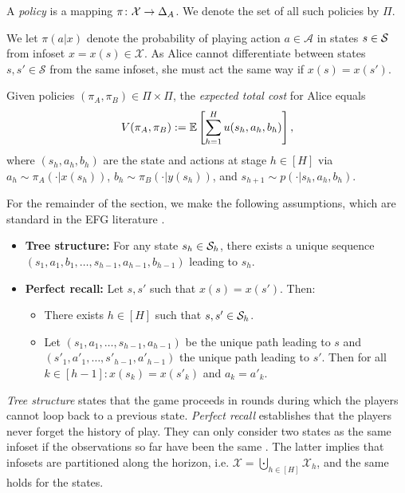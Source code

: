 \documentclass[11pt]{article}
\begin{document}
\begin{definition}\label{def:strategy}
    A \emph{policy} is a mapping $\pi \colon \mathcal{X} \to \Delta_A$. We denote the set of all such policies by $\Pi$. 
\end{definition}
We let $\pi(a|x)$ denote the probability of playing action $a \in \mathcal{A}$ in states $s \in \mathcal{S}$ from infoset $x=x(s) \in \mathcal{X}$. As Alice cannot differentiate between states $s,s' \in \mathcal{S}$ from the same infoset, she must act the same way if $x(s) = x(s')$.
\begin{definition}
    Given policies $(\pi_A,\pi_B) \in \Pi \times \Pi$, the \emph{expected total cost} for Alice equals 
    \begin{align*}
        V(\pi_A,\pi_B) := \mathbb{E}\left[ \sum_{h=1}^H u(s_h,a_h,b_h) \right],
    \end{align*}
    where $(s_h,a_h,b_h)$ are the state and actions at stage $h \in [H]$ via $a_h\sim\pi_A(\cdot|x(s_h))$, $b_h\sim\pi_B(\cdot|y(s_h))$, and $s_{h+1} \sim p(\cdot | s_h,a_h,b_h)$.
\end{definition}
For the remainder of the section, we make the following assumptions, which are standard in the EFG literature \citep{kozuno2021model,bai2022near,fiegel2023adapting,fiegel2023local}.
\begin{assumption}\label{a:1}
    \begin{itemize}[leftmargin=*]
        \item \textbf{Tree structure:} For any state $s_h \in \mathcal{S}_h$, there exists a unique sequence $(s_1,a_1,b_1, \dots,\allowbreak s_{h-1},a_{h-1},b_{h-1})$ leading to $s_h$.
        \item \textbf{Perfect recall:} Let $s,s'$ such that $x(s) = x(s')$. Then:
        \begin{itemize}[leftmargin=*]
            \item There exists $h \in [H]$ such that $s,s' \in \mathcal{S}_h$.
            \item Let $(s_1,a_1,\dots,s_{h-1},a_{h-1})$ be the unique path leading to $s$ and $(s'_1,a'_1,\dots,s'_{h-1},a'_{h-1})$ the unique path leading to $s'$. Then for all $k \in [h-1] \colon x(s_k) = x(s'_k)$ and $a_k = a'_k$.
        \end{itemize}
    \end{itemize}
\end{assumption}
\textit{Tree structure} states that the game proceeds in rounds during which the players cannot loop back to a previous state. \textit{Perfect recall} establishes that the players never forget the history of play. They can only consider two states as the same infoset if the observations so far have been the same \cite{HGPS10}. The latter implies that infosets are partitioned along the horizon, i.e. $\mathcal{X} = \bigcupdot_{h\in [H]}\mathcal{X}_h$, and the same holds for the states.
\end{document}
